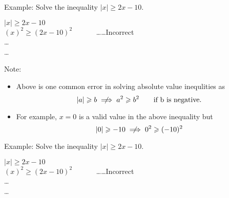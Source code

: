 \begin{tcbraster}[standard,raster equal height,raster columns=2,
colback=LightGreen,colframe=DarkGreen,colbacktitle=LimeGreen!75!DarkGreen,
left=1mm,right=1mm,top=1mm,bottom=1mm,middle=1mm]

\begin{tcolorbox}
    Example: Solve the inequality $ \lvert x \rvert \geqslant 2x-10. $


\tcbline 



\begin{warningEnv}
     $ \lvert x \rvert \geqslant 2x-10 $ \\
     $ (x)^2 \geqslant (2x-10)^2 \quad \quad \quad $ \dots \dots Incorrect \\
     \dots \\
     \dots     
\end{warningEnv}

\tcbline


Note:
\begin{itemize}
       \item[] Above is one common error in solving absolute value inequlities as 
                \[    \lvert a \rvert \geqslant b       \centernot\implies     a^2 \geqslant b^2  \quad  \quad \text{if b is negative.} \]    
    
      \item[]  For example, $x=0$ is a valid value in the above inequality but
                \[     \lvert 0 \rvert \geqslant -10       \centernot\implies     0^2 \geqslant (-10)^2 \] 
\end{itemize}






    
\end{tcolorbox}


\begin{tcolorbox}
    Example: Solve the inequality $ \lvert x \rvert \geqslant 2x-10. $


\tcbline 



\begin{warningEnv}
     $ \lvert x \rvert \geqslant 2x-10 $ \\
     $ (x)^2 \geqslant (2x-10)^2 \quad \quad \quad $ \dots \dots Incorrect \\
     \dots \\
     \dots     
\end{warningEnv}


\end{tcolorbox}
\end{tcbraster}
